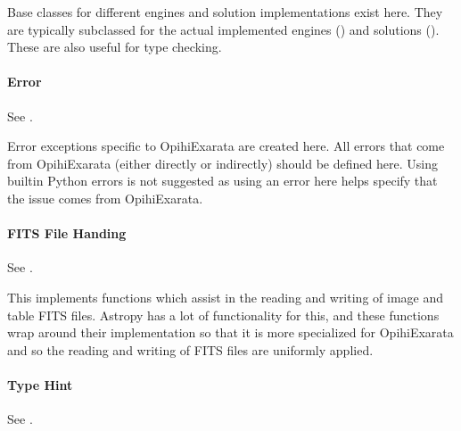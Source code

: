 \documentclass[letterpaper,11pt,english]{sphinxmanual}
\begin{document}
\sphinxAtStartPar
Base classes for different engines and solution implementations exist here.
They are typically subclassed for the actual implemented engines
({\hyperref[\detokenize{technical/architecture/services_engines:technical-architecture-services-engines}]{}}) and solutions
({\hyperref[\detokenize{technical/architecture/vehicles_solutions:technical-architecture-vehicles-solutions}]{}}). These are also useful for
type checking.


\paragraph{Error}
\label{\detokenize{technical/architecture/library:error}}
\sphinxAtStartPar
See {\hyperref[\detokenize{code/opihiexarata.library.error:module-opihiexarata.library.error}]{}}.

\sphinxAtStartPar
Error exceptions specific to OpihiExarata are created here. All errors that
come from OpihiExarata (either directly or indirectly) should be defined here.
Using built\sphinxhyphen{}in Python errors is not suggested as using an error here helps
specify that the issue comes from OpihiExarata.


\paragraph{FITS File Handing}
\label{\detokenize{technical/architecture/library:fits-file-handing}}
\sphinxAtStartPar
See {\hyperref[\detokenize{code/opihiexarata.library.fits:module-opihiexarata.library.fits}]{}}.

\sphinxAtStartPar
This implements functions which assist in the reading and writing of image and
table FITS files. Astropy has a lot of functionality for this, and these
functions wrap around their implementation so that it is more specialized for
OpihiExarata and so the reading and writing of FITS files are uniformly applied.


\paragraph{Type Hint}
\label{\detokenize{technical/architecture/library:type-hint}}
\sphinxAtStartPar
See {\hyperref[\detokenize{code/opihiexarata.library.hint:module-opihiexarata.library.hint}]{}}.
\end{document}
